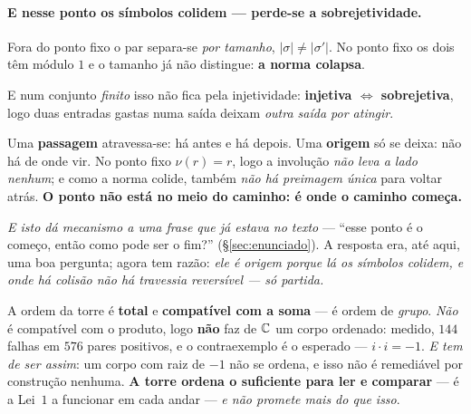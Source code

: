 \documentclass[livro.tex]{subfiles}
\begin{document}
\paragraph{E nesse ponto os símbolos colidem --- perde-se a sobrejetividade.} Fora do ponto fixo o
par separa-se \emph{por tamanho}, $|\sigma|\neq|\sigma'|$. No ponto fixo os dois têm módulo $1$ e o
tamanho já não distingue: \textbf{a norma colapsa}.


\noindent E num conjunto \emph{finito} isso não fica pela injetividade: \textbf{injetiva $\iff$
sobrejetiva}, logo duas entradas gastas numa saída deixam \emph{outra saída por atingir}.


\begin{obs}\label{obs:origem}
Uma \textbf{passagem} atravessa-se: há antes e há depois. Uma \textbf{origem} só se deixa: não há de
onde vir. No ponto fixo $\nu(r)=r$, logo a involução \emph{não leva a lado nenhum}; e como a norma
colide, também \emph{não há preimagem única} para voltar atrás. \textbf{O ponto não está no meio do
caminho: é onde o caminho começa.}

\smallskip
\noindent \emph{E isto dá mecanismo a uma frase que já estava no texto} --- ``esse ponto é o começo,
então como pode ser o fim?'' (\S\ref{sec:enunciado}). A resposta era, até aqui, uma boa pergunta;
agora tem razão: \emph{ele é origem porque lá os símbolos colidem, e onde há colisão não há
travessia reversível --- só partida.}
\end{obs}

\begin{obs}\label{obs:ordemtorre}
A ordem da torre é \textbf{total} e \textbf{compatível com a soma} --- é ordem de \emph{grupo}.
\emph{Não} é compatível com o produto, logo \textbf{não} faz de $\mathbb C$ um corpo ordenado: medido,
$144$ falhas em $576$ pares positivos, e o contraexemplo é o esperado --- $i\cdot i=-1$. \emph{E tem
de ser assim}: um corpo com raiz de $-1$ não se ordena, e isso não é remediável por construção
nenhuma. \textbf{A torre ordena o suficiente para ler e comparar} --- é a Lei~$1$ a funcionar em
cada andar --- \emph{e não promete mais do que isso}.
\end{obs}
\end{document}
